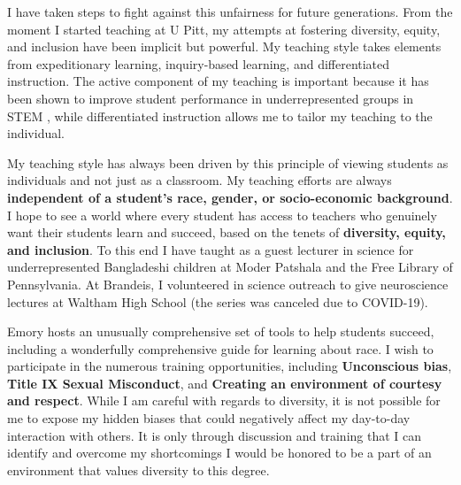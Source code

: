 \documentclass[a4paper,11pt]{article}
\begin{document}
I have taken steps to fight against this unfairness for future generations. From the moment I started teaching at U Pitt, my attempts at fostering diversity, equity, and inclusion have been implicit but powerful. My teaching style takes elements from expeditionary learning, inquiry-based learning, and differentiated instruction. The active component of my teaching is important because it has been shown to improve student performance in underrepresented groups in STEM \cite{theobald2020active}, while differentiated instruction allows me to tailor my teaching to the individual.

My teaching style has always been driven by this principle of viewing students as individuals and not just as a classroom. My teaching efforts are always \textbf{independent of a student's race, gender, or socio-economic background}. I hope to see a world where every student has access to teachers who genuinely want their students learn and succeed, based on the tenets of \textbf{diversity, equity, and inclusion}. To this end I have taught as a guest lecturer in science for underrepresented Bangladeshi children at Moder Patshala and the Free Library of Pennsylvania. At Brandeis, I volunteered in science outreach to give neuroscience lectures at Waltham High School (the series was canceled due to COVID-19).

Emory hosts an unusually comprehensive set of tools to help students succeed, including a wonderfully comprehensive guide for learning about race. I wish to participate in the numerous training opportunities, including \textbf{Unconscious bias}, \textbf{Title IX Sexual Misconduct}, and \textbf{Creating an environment of courtesy and respect}. While I am careful with regards to diversity, it is not possible for me to expose my hidden biases that could negatively affect my day-to-day interaction with others. It is only through discussion and training that I can identify and overcome my shortcomings I would be honored to be a part of an environment that values diversity to this degree.
\end{document}
